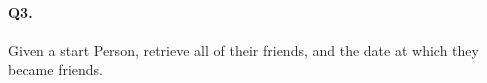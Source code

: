 \paragraph{Q3.}
Given a start Person, retrieve all of their friends, and the date at
which they became friends.
